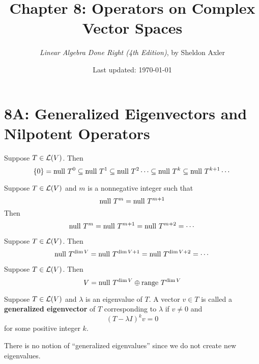 \documentclass{extarticle}
\title{\vspace{-2em}Chapter 8: Operators on Complex Vector Spaces}
\author{\emph{Linear Algebra Done Right (4th Edition)}, by Sheldon Axler}
\date{Last updated: \today}
\begin{document}
\maketitle 
\tableofcontents
\newpage 


\section*{8A: Generalized Eigenvectors and Nilpotent Operators}

\begin{lemma}
    Suppose \(T \in \mathcal{L}(V)\). Then 
    \[\{0\} = \text{null } T^0 \subseteq \text{null } T^1 
    \subseteq \text{null } T^2 \cdots \subseteq \text{null } T^k 
    \subseteq \text{null } T^{k+1} \cdots\]
\end{lemma}

\begin{lemma}
    Suppose \(T \in \mathcal{L}(V)\) and \(m\) is a nonnegative 
    integer such that 
    \[\text{null } T^m = \text{null } T^{m+1}\]
    Then 
    \[\text{null } T^{m} = \text{null } T^{m+1} = \text{null } T^{m+2} = \cdots\]
\end{lemma}

\begin{lemma}
    Suppose \(T \in \mathcal{L}(V)\). Then 
    \[\text{null } T^{\dim V} = \text{null } T^{\dim V + 1} = \text{null } T^{\dim V + 2} = \cdots\]
\end{lemma}

\begin{thm}
    Suppose \(T \in \mathcal{L}(V)\). Then 
    \[V = \text{null } T^{\dim V} \oplus \text{range } T^{\dim V}\]
\end{thm}

\begin{definition}
    Suppose \(T \in \mathcal{L}(V)\) and \(\lambda\) is an eigenvalue 
    of \(T\). A vector \(v \in T\) is called a 
    \textbf{generalized eigenvector} of \(T\) corresponding
    to \(\lambda\) if \(v \neq 0\) and 
    \[(T - \lambda I)^k v = 0\]
    for some positive integer \(k\).
\end{definition}

\begin{remark}
    There is no notion of ``generalized eigenvalues'' since 
    we do not create new eigenvalues. 
\end{remark}
\end{document}
